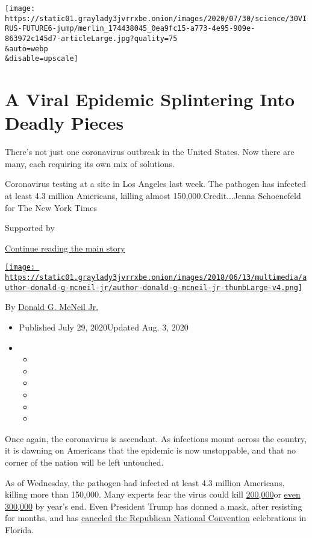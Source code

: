 \texttt{[image: https://static01.graylady3jvrrxbe.onion/images/2020/07/30/science/30VIRUS-FUTURE6-jump/merlin\_174438045\_0ea9fc15-a773-4e95-909e-863972c145d7-articleLarge.jpg?quality=75\\\&auto=webp\\\&disable=upscale]}

\hypertarget{a-viral-epidemic-splintering-into-deadly-pieces}{%
\section{A Viral Epidemic Splintering Into Deadly
Pieces}\label{a-viral-epidemic-splintering-into-deadly-pieces}}

There's not just one coronavirus outbreak in the United States. Now
there are many, each requiring its own mix of solutions.

Coronavirus testing at a site in Los Angeles last week. The pathogen has
infected at least 4.3 million Americans, killing almost
150,000.Credit...Jenna Schoenefeld for The New York Times

Supported by

\protect\hyperlink{after-sponsor}{Continue reading the main story}

\href{https://www.nytimes3xbfgragh.onion/by/donald-g-mcneil-jr}{\texttt{[image: https://static01.graylady3jvrrxbe.onion/images/2018/06/13/multimedia/author-donald-g-mcneil-jr/author-donald-g-mcneil-jr-thumbLarge-v4.png]}}

By
\href{https://www.nytimes3xbfgragh.onion/by/donald-g-mcneil-jr}{Donald
G. McNeil Jr.}

\begin{itemize}
\item
  Published July 29, 2020Updated Aug. 3, 2020
\item
  \begin{itemize}
  \item
  \item
  \item
  \item
  \item
  \item
  \end{itemize}
\end{itemize}

Once again, the coronavirus is ascendant. As infections mount across the
country, it is dawning on Americans that the epidemic is now
unstoppable, and that no corner of the nation will be left untouched.

As of Wednesday, the pathogen had infected at least 4.3 million
Americans, killing more than 150,000. Many experts fear the virus could
kill
\href{https://www.forbes.com/sites/mattperez/2020/07/07/imhe-model-projects-208255-us-deaths-by-november-but-estimate-falls-sharply-if-mask-use-increases/\#3c8ee9616f2e}{200,000}or
\href{https://www.cnbc.com/2020/07/22/dr-scott-gottlieb-us-coronavirus-deaths-may-hit-300000-by-year-end.html}{even
300,000} by year's end. Even President Trump has donned a mask, after
resisting for months, and has
\href{https://www.nytimes3xbfgragh.onion/2020/07/23/us/politics/jacksonville-rnc.html}{canceled
the Republican National Convention} celebrations in Florida.

